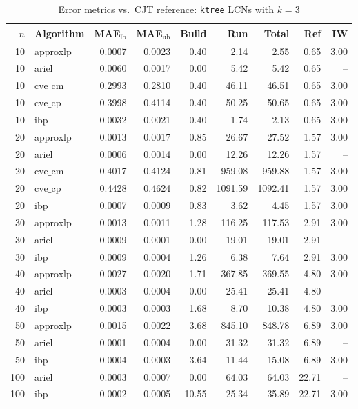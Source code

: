 \documentclass{article}
\begin{document}
\begin{table}[ht]
\centering
\caption{Error metrics vs.\ CJT reference: \texttt{ktree} LCNs with $k=3$}
\begin{tabular}{rlrrrrrrr}
\toprule
 $n$ & Algorithm & MAE$_{\text{lb}}$ & MAE$_{\text{ub}}$ & Build & Run & Total & Ref & IW \\
\midrule
 10 & approxlp & 0.0007 & 0.0023 & 0.40 & 2.14 & 2.55 & 0.65 & 3.00 \\
 10 & ariel & 0.0060 & 0.0017 & 0.00 & 5.42 & 5.42 & 0.65 & -- \\
 10 & $\text{cve\_cm}$ & 0.2993 & 0.2810 & 0.40 & 46.11 & 46.51 & 0.65 & 3.00 \\
 10 & $\text{cve\_cp}$ & 0.3998 & 0.4114 & 0.40 & 50.25 & 50.65 & 0.65 & 3.00 \\
 10 & ibp & 0.0032 & 0.0021 & 0.40 & 1.74 & 2.13 & 0.65 & 3.00 \\
\hline
 20 & approxlp & 0.0013 & 0.0017 & 0.85 & 26.67 & 27.52 & 1.57 & 3.00 \\
 20 & ariel & 0.0006 & 0.0014 & 0.00 & 12.26 & 12.26 & 1.57 & -- \\
 20 & $\text{cve\_cm}$ & 0.4017 & 0.4124 & 0.81 & 959.08 & 959.88 & 1.57 & 3.00 \\
 20 & $\text{cve\_cp}$ & 0.4428 & 0.4624 & 0.82 & 1091.59 & 1092.41 & 1.57 & 3.00 \\
 20 & ibp & 0.0007 & 0.0009 & 0.83 & 3.62 & 4.45 & 1.57 & 3.00 \\
\hline
 30 & approxlp & 0.0013 & 0.0011 & 1.28 & 116.25 & 117.53 & 2.91 & 3.00 \\
 30 & ariel & 0.0009 & 0.0001 & 0.00 & 19.01 & 19.01 & 2.91 & -- \\
 30 & ibp & 0.0009 & 0.0004 & 1.26 & 6.38 & 7.64 & 2.91 & 3.00 \\
\hline
 40 & approxlp & 0.0027 & 0.0020 & 1.71 & 367.85 & 369.55 & 4.80 & 3.00 \\
 40 & ariel & 0.0003 & 0.0004 & 0.00 & 25.41 & 25.41 & 4.80 & -- \\
 40 & ibp & 0.0003 & 0.0003 & 1.68 & 8.70 & 10.38 & 4.80 & 3.00 \\
\hline
 50 & approxlp & 0.0015 & 0.0022 & 3.68 & 845.10 & 848.78 & 6.89 & 3.00 \\
 50 & ariel & 0.0001 & 0.0004 & 0.00 & 31.32 & 31.32 & 6.89 & -- \\
 50 & ibp & 0.0004 & 0.0003 & 3.64 & 11.44 & 15.08 & 6.89 & 3.00 \\
\hline
 100 & ariel & 0.0003 & 0.0007 & 0.00 & 64.03 & 64.03 & 22.71 & -- \\
 100 & ibp & 0.0002 & 0.0005 & 10.55 & 25.34 & 35.89 & 22.71 & 3.00 \\
\bottomrule
\end{tabular}
\end{table}
\end{document}

